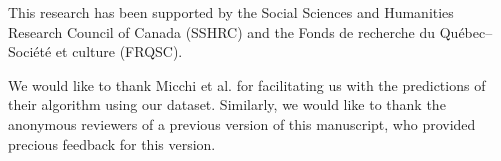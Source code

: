 \documentclass[sigconf]{acmart}
\begin{document}

\begin{acks}
This research has been supported by the Social Sciences and Humanities Research Council of Canada (SSHRC) and the Fonds de recherche du Québec–Société et culture (FRQSC).

We would like to thank Micchi et al. for facilitating us with the predictions of their algorithm \cite{Micchi20:roman} using our dataset. Similarly, we would like to thank the anonymous reviewers of a previous version of this manuscript, who provided precious feedback for this version.
\end{acks}




%
%



\end{document}
